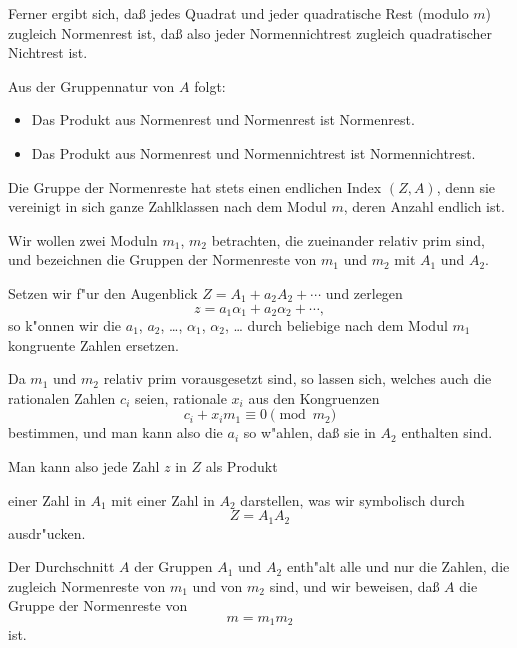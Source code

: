\documentclass[11pt,a4paper]{article}
\theoremstyle{plain}
\begin{document}
Ferner ergibt sich, da\ss{} jedes Quadrat und jeder quadratische Rest (modulo $m$) zugleich Normenrest ist, da\ss{} also jeder Normennichtrest zugleich quadratischer Nichtrest ist.

Aus der Gruppennatur von $A$ folgt:
\begin{itemize}
\item Das Produkt aus Normenrest und Normenrest ist Normenrest.
\item Das Produkt aus Normenrest und Normennichtrest ist Normennichtrest.
\end{itemize}

Die Gruppe der Normenreste hat stets einen endlichen Index $(Z, A)$, denn sie vereinigt in sich ganze Zahlklassen nach dem Modul $m$, deren Anzahl endlich ist.

\medskip

Wir wollen zwei Moduln $m_1$, $m_2$ betrachten, die zueinander relativ prim sind, und bezeichnen die Gruppen der Normenreste von $m_1$ und $m_2$ mit $A_1$ und $A_2$.

Setzen wir f"{u}r den Augenblick $Z = A_1 + a_2A_2 + \cdots$ und zerlegen
\begin{equation}
\label{eq:107_2}
z = a_1\alpha_1 + a_2\alpha_2 + \cdots,
\end{equation}
so k"{o}nnen wir die $a_1$, $a_2$, \dots, $\alpha_1$, $\alpha_2$, \dots{} durch beliebige nach dem Modul $m_1$ kongruente Zahlen ersetzen.

Da $m_1$ und $m_2$ relativ prim vorausgesetzt sind, so lassen sich, welches auch die rationalen Zahlen $c_i$ seien, rationale $x_i$ aus den Kongruenzen
\[
c_i + x_i m_1 \equiv 0 \pmod{m_2}
\]
bestimmen, und man kann also die $a_i$ so w"{a}hlen, da\ss{} sie in $A_2$ enthalten sind.

Man kann also jede Zahl $z$ in $Z$ als Produkt

\newpage
\setcounter{page}{390}

einer Zahl in $A_1$ mit einer Zahl in $A_2$ darstellen, was wir symbolisch durch
\begin{equation}
\label{eq:107_3}
Z = A_1 A_2
\end{equation}
ausdr"{u}cken.

Der Durchschnitt $A$ der Gruppen $A_1$ und $A_2$ enth"{a}lt alle und nur die Zahlen, die zugleich Normenreste von $m_1$ und von $m_2$ sind, und wir beweisen, da\ss{} $A$ die Gruppe der Normenreste von
\begin{equation}
\label{eq:107_4}
m = m_1 m_2
\end{equation}
ist.
\end{document}
